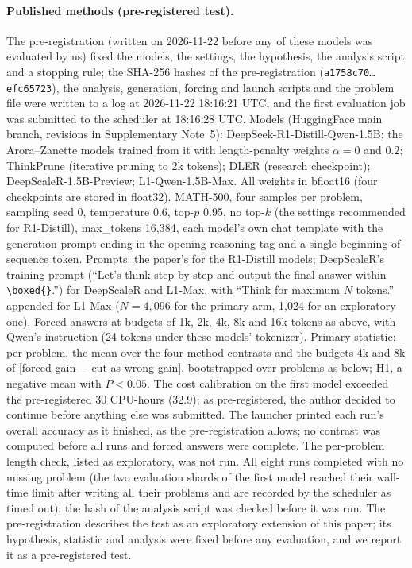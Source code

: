 \documentclass[10pt]{article}
\begin{document}
\paragraph{Published methods (pre-registered test).} The pre-registration (written on 2026-11-22 before any of these models was evaluated by us) fixed the models, the settings, the hypothesis, the analysis script and a stopping rule; the SHA-256 hashes of the pre-registration (\texttt{a1758c70\ldots efc65723}), the analysis, generation, forcing and launch scripts and the problem file were written to a log at 2026-11-22 18:16:21 UTC, and the first evaluation job was submitted to the scheduler at 18:16:28 UTC. Models (HuggingFace main branch, revisions in Supplementary Note~5): DeepSeek-R1-Distill-Qwen-1.5B; the Arora--Zanette models trained from it with length-penalty weights $\alpha=0$ and $0.2$; ThinkPrune (iterative pruning to 2k tokens); DLER (research checkpoint); DeepScaleR-1.5B-Preview; L1-Qwen-1.5B-Max. All weights in bfloat16 (four checkpoints are stored in float32). MATH-500, four samples per problem, sampling seed 0, temperature 0.6, top-$p$ 0.95, no top-$k$ (the settings recommended for R1-Distill), max\_tokens 16{,}384, each model's own chat template with the generation prompt ending in the opening reasoning tag and a single beginning-of-sequence token. Prompts: the paper's for the R1-Distill models; DeepScaleR's training prompt (``Let's think step by step and output the final answer within \texttt{\textbackslash boxed\{\}}.'') for DeepScaleR and L1-Max, with ``Think for maximum $N$ tokens.'' appended for L1-Max ($N=4{,}096$ for the primary arm, 1{,}024 for an exploratory one). Forced answers at budgets of 1k, 2k, 4k, 8k and 16k tokens as above, with Qwen's instruction (24 tokens under these models' tokenizer). Primary statistic: per problem, the mean over the four method contrasts and the budgets 4k and 8k of [forced gain $-$ cut-as-wrong gain], bootstrapped over problems as below; H1, a negative mean with $P<0.05$. The cost calibration on the first model exceeded the pre-registered 30 CPU-hours (32.9); as pre-registered, the author decided to continue before anything else was submitted. The launcher printed each run's overall accuracy as it finished, as the pre-registration allows; no contrast was computed before all runs and forced answers were complete. The per-problem length check, listed as exploratory, was not run. All eight runs completed with no missing problem (the two evaluation shards of the first model reached their wall-time limit after writing all their problems and are recorded by the scheduler as timed out); the hash of the analysis script was checked before it was run. The pre-registration describes the test as an exploratory extension of this paper; its hypothesis, statistic and analysis were fixed before any evaluation, and we report it as a pre-registered test.
\end{document}
